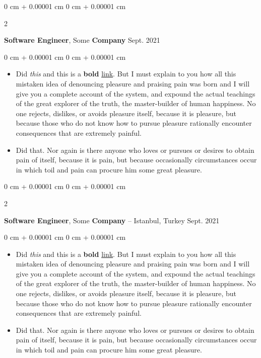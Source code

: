 \documentclass[10pt, letterpaper]{article}
\newenvironment{highlights}{
    \begin{itemize}[
        topsep=0.10 cm,
        parsep=0.10 cm,
        partopsep=0pt,
        itemsep=0pt,
        leftmargin=0 cm + 10pt
    ]
}{
    \end{itemize}
} %
\newenvironment{onecolentry}{
    \begin{adjustwidth}{
        0 cm + 0.00001 cm
    }{
        0 cm + 0.00001 cm
    }
}{
    \end{adjustwidth}
} %
\newenvironment{twocolentry}[2][]{
    \onecolentry
    \def\secondColumn{#2}
    \setcolumnwidth{\fill, 4.5 cm}
    \begin{paracol}{2}
}{
    \switchcolumn \raggedleft \secondColumn
    \end{paracol}
    \endonecolentry
} %
\begin{document}
        \vspace{0.2 cm}

        \begin{twocolentry}{
            Sept. 2021
        }
            \textbf{Software Engineer}, Some \textbf{Company}\end{twocolentry}

        \vspace{0.10 cm}
        \begin{onecolentry}
            \begin{highlights}
                \item Did \textit{this} and this is a \textbf{bold} \href{https://example.com}{link}. But I must explain to you how all this mistaken idea of denouncing pleasure and praising pain was born and I will give you a complete account of the system, and expound the actual teachings of the great explorer of the truth, the master-builder of human happiness. No one rejects, dislikes, or avoids pleasure itself, because it is pleasure, but because those who do not know how to pursue pleasure rationally encounter consequences that are extremely painful.
                \item Did that. Nor again is there anyone who loves or pursues or desires to obtain pain of itself, because it is pain, but because occasionally circumstances occur in which toil and pain can procure him some great pleasure.
            \end{highlights}
        \end{onecolentry}


        \vspace{0.2 cm}

        \begin{twocolentry}{
            Sept. 2021
        }
            \textbf{Software Engineer}, Some \textbf{Company} -- Istanbul, Turkey\end{twocolentry}

        \vspace{0.10 cm}
        \begin{onecolentry}
            \begin{highlights}
                \item Did \textit{this} and this is a \textbf{bold} \href{https://example.com}{link}. But I must explain to you how all this mistaken idea of denouncing pleasure and praising pain was born and I will give you a complete account of the system, and expound the actual teachings of the great explorer of the truth, the master-builder of human happiness. No one rejects, dislikes, or avoids pleasure itself, because it is pleasure, but because those who do not know how to pursue pleasure rationally encounter consequences that are extremely painful.
                \item Did that. Nor again is there anyone who loves or pursues or desires to obtain pain of itself, because it is pain, but because occasionally circumstances occur in which toil and pain can procure him some great pleasure.
            \end{highlights}
        \end{onecolentry}
\end{document}
